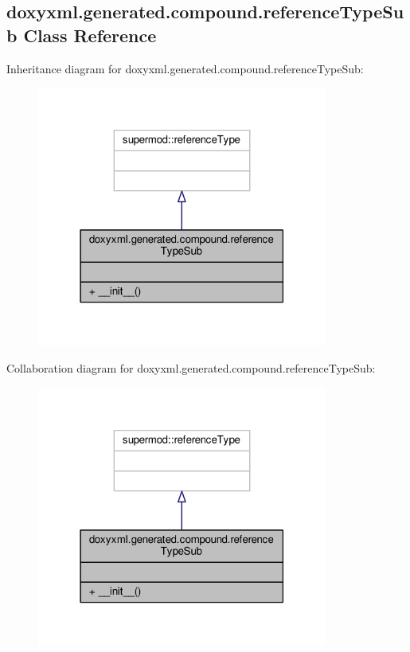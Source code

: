 \subsection{doxyxml.\+generated.\+compound.\+reference\+Type\+Sub Class Reference}
\label{classdoxyxml_1_1generated_1_1compound_1_1referenceTypeSub}


Inheritance diagram for doxyxml.\+generated.\+compound.\+reference\+Type\+Sub\+:
\nopagebreak
\begin{figure}[H]
\begin{center}
\leavevmode
\includegraphics[width=271pt]{d0/d5d/classdoxyxml_1_1generated_1_1compound_1_1referenceTypeSub__inherit__graph}
\end{center}
\end{figure}


Collaboration diagram for doxyxml.\+generated.\+compound.\+reference\+Type\+Sub\+:
\nopagebreak
\begin{figure}[H]
\begin{center}
\leavevmode
\includegraphics[width=271pt]{d7/d87/classdoxyxml_1_1generated_1_1compound_1_1referenceTypeSub__coll__graph}
\end{center}
\end{figure}
